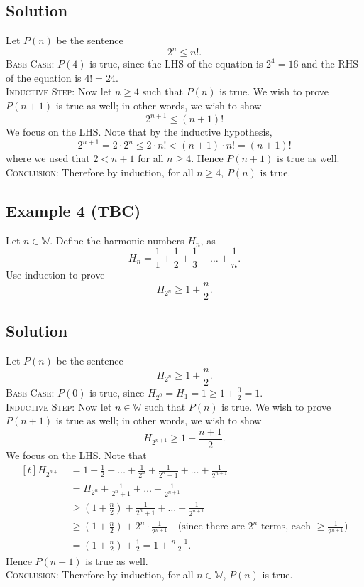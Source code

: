 \documentclass{article}
\begin{document}
\subsection*{Solution}
    Let $P(n)$ be the sentence $$2^{n} \le n!.$$
    \textsc{Base Case}: $P(4)$ is true, since the LHS of the equation is $2^4 = 16$ and the RHS of the equation is $4! = 24.$ \\
    \textsc{Inductive Step}: Now let $n \ge 4$ such that $P(n)$ is true. We wish to prove $P(n + 1)$ is true as well; in other words, we wish to show $$2^{n+1} \le (n+1)!$$ We focus on the LHS. Note that by the inductive hypothesis, $$2^{n+1} = 2 \cdot 2^n \le 2 \cdot n! < (n+1) \cdot n! = (n+1)!$$
    where we used that $2 < n + 1$ for all $n \ge 4$. Hence $P(n + 1)$ is true as well. \\
    \textsc{Conclusion}: Therefore by induction, for all $n \ge 4$, $P(n)$ is true.


\subsection*{Example 4 (TBC)}
    Let $n \in \mathbb{W}$. Define the harmonic numbers $H_{n}$, as $$H_{n} = \frac{1}{1} + \frac{1}{2} + \frac{1}{3} + \dots + \frac{1}{n}.$$ Use induction to prove $$H_{2^{n}} \ge 1 + \frac{n}{2}.$$

\subsection*{Solution}
    Let $P(n)$ be the sentence $$H_{2^{n}} \ge 1 + \frac{n}{2}.$$
    \textsc{Base Case}: $P(0)$ is true, since $H_{2^{0}} = H_{1} = 1 \ge 1 + \frac{0}{2} = 1$. \\
    \textsc{Inductive Step}: Now let $n \in \mathbb{W}$ such that $P(n)$ is true. We wish to prove $P(n + 1)$ is true as well; in other words, we wish to show $$H_{2^{n + 1}} \ge 1 + \frac{n + 1}{2}.$$ We focus on the LHS. Note that
    $$\begin{aligned}[t]
        H_{2^{n + 1}} &= 1 + \frac{1}{2} + \dots + \frac{1}{2^{n}} + \frac{1}{2^{n} + 1} + \dots + \frac{1}{2^{n + 1}} \\
        &= H_{2^{n}} + \frac{1}{2^{n} + 1} + \dots + \frac{1}{2^{n + 1}} \\
        &\ge \left(1 + \frac{n}{2}\right) + \frac{1}{2^{n} + 1} + \dots + \frac{1}{2^{n + 1}} \\
        &\ge \left(1 + \frac{n}{2}\right) + 2^{n} \cdot \frac{1}{2^{n + 1}} \quad \text{(since there are $2^{n}$ terms, each $\ge \frac{1}{2^{n + 1}}$)} \\ 
        &= \left(1 + \frac{n}{2}\right) + \frac{1}{2} = 1 + \frac{n + 1}{2}.
    \end{aligned}$$
    Hence $P(n + 1)$ is true as well. \\
    \textsc{Conclusion}: Therefore by induction, for all $n \in \mathbb{W}$, $P(n)$ is true.
\end{document}
